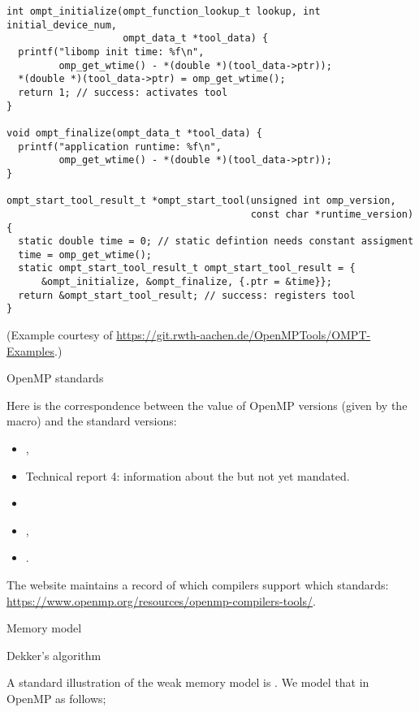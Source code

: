 \begin{lstlisting}
int ompt_initialize(ompt_function_lookup_t lookup, int initial_device_num,
                    ompt_data_t *tool_data) {
  printf("libomp init time: %f\n",
         omp_get_wtime() - *(double *)(tool_data->ptr));
  *(double *)(tool_data->ptr) = omp_get_wtime();
  return 1; // success: activates tool
}

void ompt_finalize(ompt_data_t *tool_data) {
  printf("application runtime: %f\n",
         omp_get_wtime() - *(double *)(tool_data->ptr));
}

ompt_start_tool_result_t *ompt_start_tool(unsigned int omp_version,
                                          const char *runtime_version) {
  static double time = 0; // static defintion needs constant assigment
  time = omp_get_wtime();
  static ompt_start_tool_result_t ompt_start_tool_result = {
      &ompt_initialize, &ompt_finalize, {.ptr = &time}};
  return &ompt_start_tool_result; // success: registers tool
}  
\end{lstlisting}
(Example courtesy of \url{https://git.rwth-aachen.de/OpenMPTools/OMPT-Examples}.)

 {OpenMP standards}
\label{sec:omp-standards}

Here is the correspondence between the value of OpenMP versions
(given by the  macro)
and the standard versions:

\begin{multicols}{2}
  \begin{itemize}
  \item {} ,
  \item {} Technical report 4: information about the 
    but not yet mandated.
  \item {} 
  \item {} ,
  \item {} .
  \end{itemize}
  \columnbreak
\end{multicols}

The  website maintains a record of which compilers
support which standards: \url{https://www.openmp.org/resources/openmp-compilers-tools/}.

 {Memory model}
\label{sec:omp-memory}

 {Dekker's algorithm}

A standard illustration of the weak memory model is
.
We model that in OpenMP as follows;

